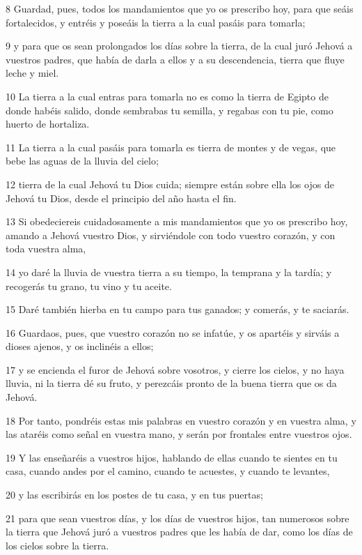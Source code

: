 \par 8 Guardad, pues, todos los mandamientos que yo os prescribo hoy, para que seáis fortalecidos, y entréis y poseáis la tierra a la cual pasáis para tomarla;
\par 9 y para que os sean prolongados los días sobre la tierra, de la cual juró Jehová a vuestros padres, que había de darla a ellos y a su descendencia, tierra que fluye leche y miel.
\par 10 La tierra a la cual entras para tomarla no es como la tierra de Egipto de donde habéis salido, donde sembrabas tu semilla, y regabas con tu pie, como huerto de hortaliza.
\par 11 La tierra a la cual pasáis para tomarla es tierra de montes y de vegas, que bebe las aguas de la lluvia del cielo;
\par 12 tierra de la cual Jehová tu Dios cuida; siempre están sobre ella los ojos de Jehová tu Dios, desde el principio del año hasta el fin.
\par 13 Si obedeciereis cuidadosamente a mis mandamientos que yo os prescribo hoy, amando a Jehová vuestro Dios, y sirviéndole con todo vuestro corazón, y con toda vuestra alma,
\par 14 yo daré la lluvia de vuestra tierra a su tiempo, la temprana y la tardía; y recogerás tu grano, tu vino y tu aceite.
\par 15 Daré también hierba en tu campo para tus ganados; y comerás, y te saciarás.
\par 16 Guardaos, pues, que vuestro corazón no se infatúe, y os apartéis y sirváis a dioses ajenos, y os inclinéis a ellos;
\par 17 y se encienda el furor de Jehová sobre vosotros, y cierre los cielos, y no haya lluvia, ni la tierra dé su fruto, y perezcáis pronto de la buena tierra que os da Jehová.
\par 18 Por tanto, pondréis estas mis palabras en vuestro corazón y en vuestra alma, y las ataréis como señal en vuestra mano, y serán por frontales entre vuestros ojos.
\par 19 Y las enseñaréis a vuestros hijos, hablando de ellas cuando te sientes en tu casa, cuando andes por el camino, cuando te acuestes, y cuando te levantes,
\par 20 y las escribirás en los postes de tu casa, y en tus puertas;
\par 21 para que sean vuestros días, y los días de vuestros hijos, tan numerosos sobre la tierra que Jehová juró a vuestros padres que les había de dar, como los días de los cielos sobre la tierra.
